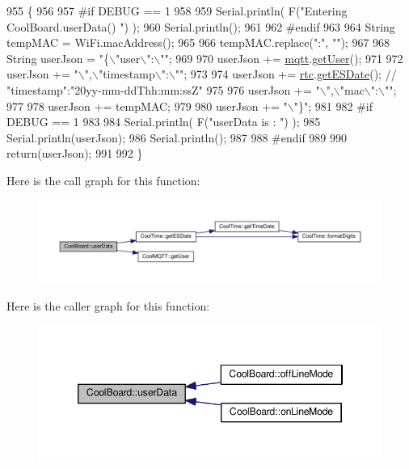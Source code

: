 \begin{DoxyCode}
955 \{
956 
957 \textcolor{preprocessor}{#if DEBUG == 1}
958 
959     Serial.println( F(\textcolor{stringliteral}{"Entering CoolBoard.userData() "}) );
960     Serial.println();
961 
962 \textcolor{preprocessor}{#endif}
963 
964     String tempMAC = WiFi.macAddress();
965 
966     tempMAC.replace(\textcolor{stringliteral}{":"}, \textcolor{stringliteral}{""});
967 
968     String userJson = \textcolor{stringliteral}{"\{\(\backslash\)"user\(\backslash\)":\(\backslash\)""};
969 
970     userJson += \hyperlink{classCoolBoard_a2399f44d7c23c1149a335cb3b46d90f1}{mqtt}.\hyperlink{classCoolMQTT_a373cc92fca7760d886f02d8a6e5b3f63}{getUser}();
971 
972     userJson += \textcolor{stringliteral}{"\(\backslash\)",\(\backslash\)"timestamp\(\backslash\)":\(\backslash\)""};
973 
974     userJson += \hyperlink{classCoolBoard_a50d2a6716879d64a85f3c6b44ad63275}{rtc}.\hyperlink{classCoolTime_ac4f32ee513c1328d984306645e8785a4}{getESDate}(); \textcolor{comment}{// "timestamp":"20yy-mm-ddThh:mm:ssZ"}
975 
976     userJson += \textcolor{stringliteral}{"\(\backslash\)",\(\backslash\)"mac\(\backslash\)":\(\backslash\)""};
977 
978     userJson += tempMAC;
979 
980     userJson += \textcolor{stringliteral}{"\(\backslash\)"\}"};
981 
982 \textcolor{preprocessor}{#if DEBUG == 1}
983 
984     Serial.println( F(\textcolor{stringliteral}{"userData is : "}) );
985     Serial.println(userJson);
986     Serial.println();
987 
988 \textcolor{preprocessor}{#endif  }
989     
990     \textcolor{keywordflow}{return}(userJson);
991     
992 \}
\end{DoxyCode}
Here is the call graph for this function\+:\nopagebreak
\begin{figure}[H]
\begin{center}
\leavevmode
\includegraphics[width=350pt]{classCoolBoard_ae7358fb6e623cfc81b775f5f1734909b_cgraph}
\end{center}
\end{figure}
Here is the caller graph for this function\+:\nopagebreak
\begin{figure}[H]
\begin{center}
\leavevmode
\includegraphics[width=346pt]{classCoolBoard_ae7358fb6e623cfc81b775f5f1734909b_icgraph}
\end{center}
\end{figure}


